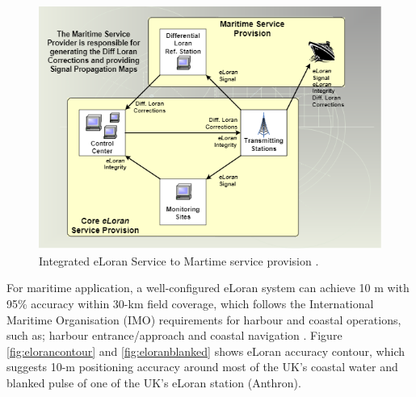 \begin{figure}[!ht]
    \centering
    \includegraphics[scale=0.7]{Figures/ELORAN_maritime_app.PNG}
    \caption{Integrated eLoran Service to Martime service provision \cite{InternationalLORANAssociation2007EnhancedApril}.}
    \label{fig:eloranmaritimeapp}
\end{figure}

\noindent For maritime application, a well-configured eLoran system can achieve 10 m with 95\% accuracy within 30-km field coverage, which follows the International Maritime Organisation (IMO) requirements for harbour and coastal operations, such as; harbour entrance/approach and coastal navigation \cite{SharedTutorial}\cite{Son2020ELoran:Areas}\cite{SafarAIONS}. Figure \ref{fig:elorancontour}  and \ref{fig:eloranblanked} shows eLoran accuracy contour, which suggests 10-m positioning accuracy around most of the UK's coastal water and blanked pulse of one of the UK's eLoran station (Anthron).\\


